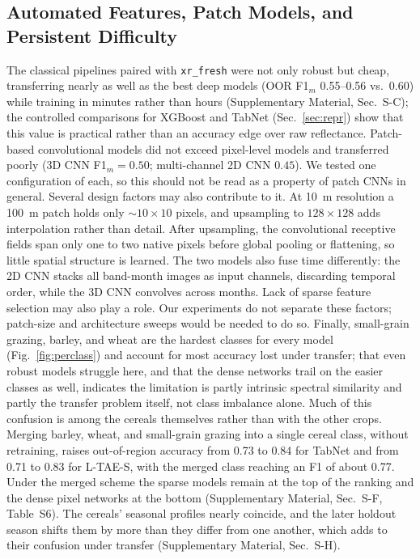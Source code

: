 \documentclass[preprint,authoryear]{elsarticle}
\begin{document}
\subsection{Automated Features, Patch Models, and Persistent Difficulty}
The classical pipelines paired with \texttt{xr\_fresh} were not only robust but cheap, transferring nearly as well as the best deep models (OOR F1$_m$ 0.55--0.56 vs.\ 0.60) while training in minutes rather than hours (Supplementary Material, Sec.~S-C); the controlled comparisons for XGBoost and TabNet (Sec.~\ref{sec:repr}) show that this value is practical rather than an accuracy edge over raw reflectance. Patch-based convolutional models did not exceed pixel-level models and transferred poorly (3D CNN F1$_m=0.50$; multi-channel 2D CNN $0.45$). We tested one configuration of each, so this should not be read as a property of patch CNNs in general. Several design factors may also contribute to it. At 10~m resolution a 100~m patch holds only ${\sim}10\times10$ pixels, and upsampling to $128\times128$ adds interpolation rather than detail. After upsampling, the convolutional receptive fields span only one to two native pixels before global pooling or flattening, so little spatial structure is learned. The two models also fuse time differently: the 2D CNN stacks all band-month images as input channels, discarding temporal order, while the 3D CNN convolves across months. Lack of sparse feature selection may also play a role. Our experiments do not separate these factors; patch-size and architecture sweeps would be needed to do so. Finally, small-grain grazing, barley, and wheat are the hardest classes for every model (Fig.~\ref{fig:perclass}) and account for most accuracy lost under transfer; that even robust models struggle here, and that the dense networks trail on the easier classes as well, indicates the limitation is partly intrinsic spectral similarity and partly the transfer problem itself, not class imbalance alone. Much of this confusion is among the cereals themselves rather than with the other crops. Merging barley, wheat, and small-grain grazing into a single cereal class, without retraining, raises out-of-region accuracy from 0.73 to 0.84 for TabNet and from 0.71 to 0.83 for L-TAE-S, with the merged class reaching an F1 of about 0.77. Under the merged scheme the sparse models remain at the top of the ranking and the dense pixel networks at the bottom (Supplementary Material, Sec.~S-F, Table~S6). The cereals' seasonal profiles nearly coincide, and the later holdout season shifts them by more than they differ from one another, which adds to their confusion under transfer (Supplementary Material, Sec.~S-H).
\end{document}
